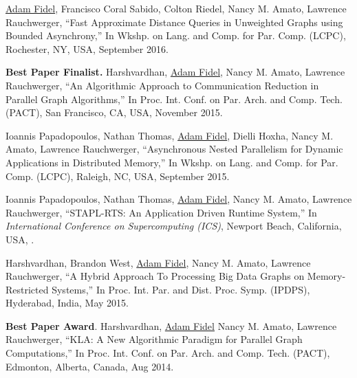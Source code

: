 \documentclass[a4paper,10pt,oneside]{article}
\begin{document}
\begin{body}
%


{\underline{Adam Fidel}, Francisco Coral Sabido, Colton Riedel, Nancy M. Amato, Lawrence Rauchwerger, ``Fast Approximate Distance Queries in Unweighted Graphs using Bounded Asynchrony,'' In Wkshp. on Lang. and Comp. for Par. Comp. (LCPC), Rochester, NY, USA, September 2016.}

\EntryGap
{{\bf Best Paper Finalist.} Harshvardhan, \underline{Adam Fidel}, Nancy M. Amato, Lawrence Rauchwerger, ``An Algorithmic Approach to Communication Reduction in Parallel Graph Algorithms,'' In Proc. Int. Conf. on Par. Arch. and Comp. Tech. (PACT), San Francisco, CA, USA, November 2015.}

\EntryGap

{Ioannis Papadopoulos, Nathan Thomas, \underline{Adam Fidel}, Dielli Hoxha, Nancy M. Amato, Lawrence Rauchwerger, ``Asynchronous Nested Parallelism for Dynamic Applications in Distributed Memory,'' In Wkshp. on Lang. and Comp. for Par. Comp. (LCPC), Raleigh, NC, USA, September 2015.}

\EntryGap

{Ioannis Papadopoulos, Nathan Thomas, \underline{Adam Fidel}, Nancy M. Amato, Lawrence Rauchwerger, ``STAPL-RTS: An Application Driven Runtime System,'' In \textit{International Conference on Supercomputing (ICS)}, Newport Beach, California, USA, .}

\EntryGap

{Harshvardhan, Brandon West, \underline{Adam Fidel}, Nancy M. Amato, Lawrence Rauchwerger, ``A Hybrid Approach To Processing Big Data Graphs on Memory-Restricted Systems,'' In Proc. Int. Par. and Dist. Proc. Symp. (IPDPS), Hyderabad, India, May 2015.}

\EntryGap

{{\bf Best Paper Award}. Harshvardhan, \underline{Adam Fidel} Nancy M. Amato, Lawrence Rauchwerger, ``KLA: A New Algorithmic Paradigm for Parallel Graph Computations,'' In Proc. Int. Conf. on Par. Arch. and Comp. Tech. (PACT), Edmonton, Alberta, Canada, Aug 2014.}


\end{body}
\end{document}
